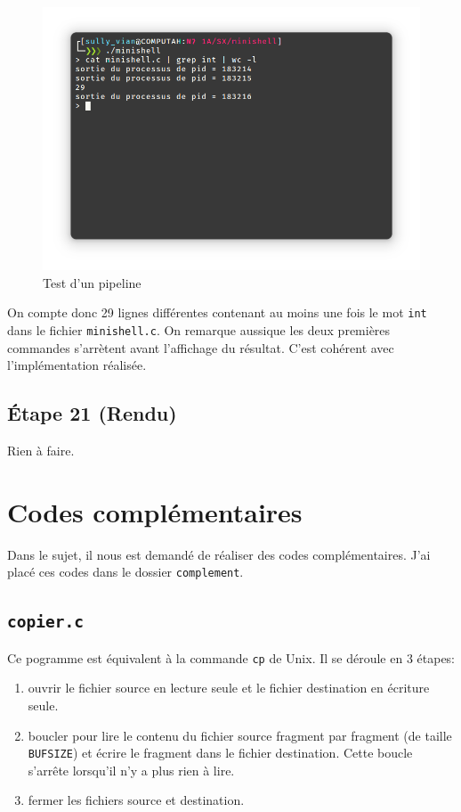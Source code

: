 \documentclass{article}
\begin{document}
\begin{figure}[H]
    \centering
    \includegraphics[width=\textwidth]{./resources/E20.png}
    \caption{Test d'un pipeline}
\end{figure}

On compte donc 29 lignes différentes contenant au moins une fois le mot \texttt{int} dans le fichier \texttt{minishell.c}. On remarque aussique les deux premières commandes s'arrètent avant l'affichage du résultat. C'est cohérent avec l'implémentation réalisée.

\subsection*{Étape 21 (Rendu)}

Rien à faire.

\section{Codes complémentaires}

Dans le sujet, il nous est demandé de réaliser des codes complémentaires. J'ai placé ces codes dans le dossier \texttt{complement}.

\subsection{\texttt{copier.c}}

Ce pogramme est équivalent à la commande \texttt{cp} de Unix. Il se déroule en 3 étapes:

\begin{enumerate}
    \item ouvrir le fichier source en lecture seule et le fichier destination en écriture seule.
    \item boucler pour lire le contenu du fichier source fragment par fragment (de taille \texttt{BUFSIZE}) et écrire le fragment dans le fichier destination. Cette boucle s'arrête lorsqu'il n'y a plus rien à lire.
    \item fermer les fichiers source et destination.
\end{enumerate}
\end{document}
